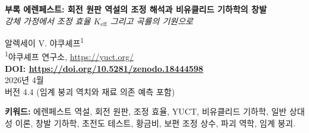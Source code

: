 \documentclass[12pt,a4paper]{article}
\newcommand{\Sodd}{S_{\mathrm{odd}}}
\newcommand{\Seven}{S_{\mathrm{even}}}
\begin{document}
	
	\begin{titlepage}
		\begin{center}
			\vspace*{1cm}
			\Huge\textbf{부록 에렌페스트: 회전 원판 역설의 조정 해석과 비유클리드 기하학의 창발} \\
			\vspace{0.5cm}
			\Large\textit{강체 가정에서 조정 효율 \(K_{\mathrm{eff}}\) 그리고 곡률의 기원으로}
			\vspace{1.5cm}
			
			\Large 알렉세이 V. 야쿠셰프\textsuperscript{1} \\
			\vspace{0.3cm}
			\large \textsuperscript{1}야쿠셰프 연구소, \url{https://yuct.org/} \\
			\vspace{1cm}
			\textbf{DOI: \url{https://doi.org/10.5281/zenodo.18444598}} \\
			\vspace{1cm}
			2026년 4월 \\ \large 버전 4.4 (임계 붕괴 역치와 재료 의존 예측 포함)
			\vspace{2cm}
			
			\begin{minipage}{0.9\textwidth}
				\begin{abstract}
					\noindent
					에렌페스트 역설(1910)은 상대론적 길이 수축을 존중하면서 회전하는 원판 위에서 유클리드 기하학을 유지하는 것이 불가능함을 지적한다. 일반 상대성 이론에서 이 역설은 회전하는 관찰자에 대해 비유클리드 기하학을 도입함으로써 해결된다. 여기서 우리는 부록 Ferra1.2에서 유도된 보편적 조정 상수에 기반한 야쿠셰프 통일 조정 이론(YUCT)의 해석을 제시한다. 원주가 겉보기에 수축하는 것은 상호 거리의 사전 분배 사전을 통해 달성되는 높은 조정 효율 \(K_{\mathrm{eff}} > 1\)의 발현임을 보여준다. 기본 상수 \(\Sodd = 6/5 = 1.2\), \(\Seven = 4/5 = 0.8\), 그 합 \(2\), 비율 \(3/2\), 그리고 관계식 \(\Sodd \varphi^2 \approx \pi\)(여기서 \(\varphi\)는 황금비)가 기하학적 뼈대를 제공한다. \textbf{조정 중심}(회전축)의 개념을 도입한다. 그 존재는 조정된 물질에 의존한다. 각속도가 임계 역치를 초과하면 물질의 조정 효율 \(K_{\mathrm{eff,mat}}\)이 임계값 \(K_{\mathrm{crit}}\) 아래로 떨어져 조정의 치명적인 손실을 초래한다 — 원판은 붕괴되고 축은 물리적으로 구별된 선으로 존재하지 않게 된다. 임계 각속도에 대한 정량적 예측을 측정 가능한 물질 매개변수(영률, 밀도, 인장 강도)로 유도하고, \(K_{\mathrm{eff,mat}}=1\)의 극한에서 파괴 역학의 표준 공식이 회복됨을 보여준다. 이 프레임워크를 대안 이론(일반 상대성 이론, 고전 탄성론)과 비교하고 검증 가능한 새로운 예측을 제공함을 보여준다. 즉, 초전도 원판의 임계 속도는 일반 원판과 달라야 하며, 이는 재료 의존적 조정 효율의 직접적인 결과이다. 상세한 실험 프로토콜을 개략하고, 고온 초전도체 원판에 대한 수치 추정치를 제공한다.
				\end{abstract}
			\end{minipage}
			\vspace{1cm}
			
			\noindent \textbf{키워드:} 에렌페스트 역설, 회전 원판, 조정 효율, YUCT, 비유클리드 기하학, 일반 상대성 이론, 창발 기하학, 초전도 테스트, 황금비, 보편 조정 상수, 파괴 역학, 임계 붕괴.
		\end{center}
	\end{titlepage}
	
\end{document}
